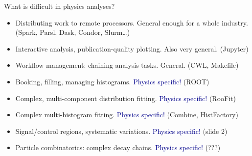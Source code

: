 \documentclass[aspectratio=169]{beamer}
\begin{document}
\begin{frame}{What is difficult in physics analyses?}
\large
\vspace{0.5 cm}
\begin{itemize}\setlength{\itemsep}{0.35 cm}
\item<1-> Distributing work to remote processors. General enough for a whole industry. (Spark, Parsl, Dask, Condor, Slurm\ldots)
\item<1-> Interactive analysis, publication-quality plotting. Also very general. (Jupyter)
\item<1-> Workflow management: chaining analysis tasks. General. (CWL, Makefile)
\item<2-> Booking, filling, managing histograms. \textcolor{darkblue}{Physics specific!} (ROOT)
\item<2-> Complex, multi-component distribution fitting. \textcolor{darkblue}{Physics specific!} (RooFit)
\item<2-> Complex multi-histogram fitting. \textcolor{darkblue}{Physics specific!} (Combine, HistFactory)
\item<3-> Signal/control regions, systematic variations. \textcolor{darkblue}{Physics specific!} (slide 2)
\item<3-> Particle combinatorics: complex decay chains. \textcolor{darkblue}{Physics specific!} (???)
\end{itemize}
\end{frame}
\end{document}
